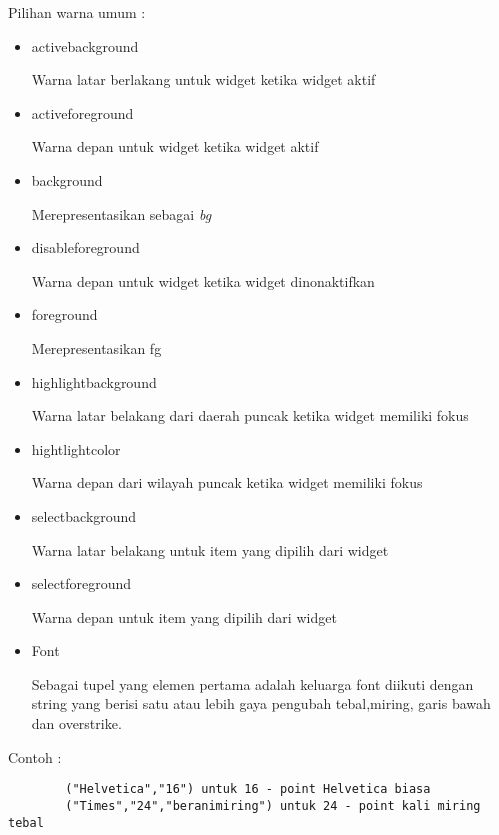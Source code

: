 \documentclass [12pt,a4paper,notitlepage,oneside,bahasa]{article}
\begin{document}
\vspace{12pt}
Pilihan warna umum :
\noindent 
\begin{itemize}
	\item activebackground \par
	Warna latar berlakang untuk widget ketika widget aktif \par
	\noindent 
	\item activeforeground \par
	Warna depan untuk widget ketika widget aktif \par
	\noindent 
	\item background \par
	Merepresentasikan sebagai \textit{bg} \par
	\noindent 
	\item disableforeground \par
	Warna depan untuk widget ketika widget dinonaktifkan \par
	\noindent 
	\item foreground \par
	Merepresentasikan fg \par
	\noindent 
	\item highlightbackground \par
	Warna latar belakang dari daerah puncak ketika widget memiliki fokus \par
	\noindent 
	\item hightlightcolor \par
	Warna depan dari wilayah puncak ketika widget memiliki fokus \par
	\noindent 
	\item selectbackground \par
	Warna latar belakang untuk item yang dipilih dari widget \par
	\noindent 
	\item selectforeground \par
	Warna depan untuk item yang dipilih dari widget \par
	\noindent 
	\item Font \par
	\noindent 
	Sebagai tupel yang elemen pertama adalah keluarga font diikuti dengan string yang berisi satu atau lebih gaya pengubah tebal,miring, garis bawah dan overstrike. 
\end{itemize}
	\noindent 
Contoh : \par
	\begin{verbatim}
		("Helvetica","16") untuk 16 - point Helvetica biasa
		("Times","24","beranimiring") untuk 24 - point kali miring tebal
	\end{verbatim}
\end{document}
